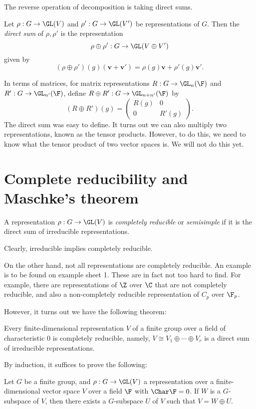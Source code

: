 \documentclass[a4paper]{article}
\begin{document}
The reverse operation of decomposition is taking direct sums.
\begin{defi}
  Let $\rho: G\to \GL(V)$ and $\rho': G \to \GL(V')$ be representations of $G$. Then the \emph{direct sum} of $\rho, \rho'$ is the representation
  \[
    \rho \oplus \rho': G \to \GL(V \oplus V')
  \]
  given by
  \[
    (\rho \oplus \rho')(g)(\mathbf{v} + \mathbf{v}') = \rho(g) \mathbf{v} + \rho'(g) \mathbf{v}'.
  \]
\end{defi}
In terms of matrices, for matrix representations $R: G \to \GL_n(\F)$ and $R': G \to \GL_{n'}(\F)$, define $R \oplus R': G \to \GL_{n + n'}(\F)$ by
\[
  (R\oplus R') (g) =
  \begin{pmatrix}
    R(g) & 0\\
    0 & R'(g)
  \end{pmatrix}.
\]
The direct sum was easy to define. It turns out we can also multiply two representations, known as the tensor products. However, to do this, we need to know what the tensor product of two vector spaces is. We will not do this yet.

\section{Complete reducibility and Maschke's theorem}
\begin{defi}
  A representation $\rho: G \to \GL(V)$ is \emph{completely reducible} or \emph{semisimple} if it is the direct sum of irreducible representations.
\end{defi}
Clearly, irreducible implies completely reducible.

On the other hand, not all representations are completely reducible. An example is to be found on example sheet 1. These are in fact not too hard to find. For example, there are representations of $\Z$ over $\C$ that are not completely reducible, and also a non-completely reducible representation of $C_p$ over $\F_p$.

However, it turns out we have the following theorem:
\begin{thm}
  Every finite-dimensional representation $V$ of a finite group over a field of characteristic $0$ is completely reducible, namely, $V \cong V_1 \oplus \cdots \oplus V_r$ is a direct sum of irreducible representations.
\end{thm}
By induction, it suffices to prove the following:
\begin{thm}
  Let $G$ be a finite group, and $\rho: G \to \GL(V)$ a representation over a finite-dimensional vector space $V$ over a field $\F $ with $\Char \F = 0$. If $W$ is a $G$-subspace of $V$, then there exists a $G$-subspace $U$ of $V$ such that $V = W \oplus U$.
\end{thm}
\end{document}
